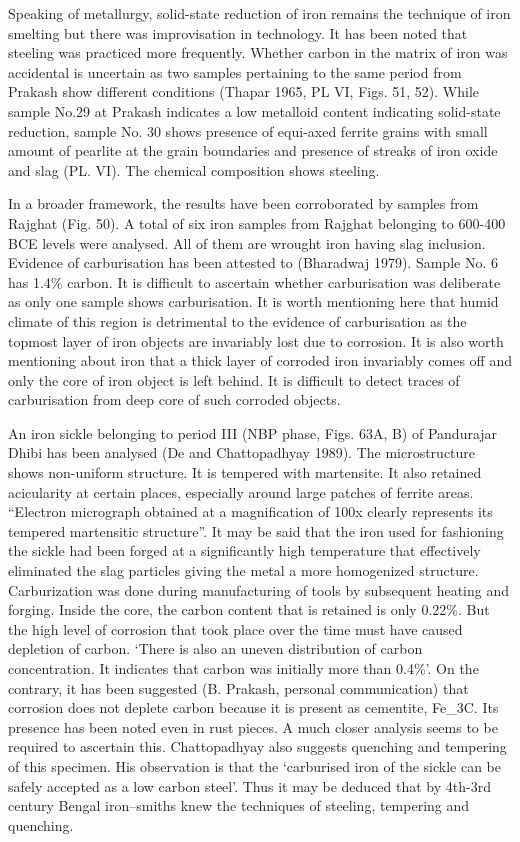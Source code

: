 Speaking of metallurgy, solid-state reduction of iron remains the technique of iron smelting but there was improvisation in technology. It has been noted that steeling was practiced more frequently. Whether carbon in the matrix of iron was accidental is uncertain as two samples pertaining to the same period from Prakash show different conditions (Thapar 1965, PL VI, Figs. 51, 52). While sample No.29 at Prakash indicates a low metalloid content indicating solid-state reduction, sample No. 30 shows presence of equi-axed ferrite grains with small amount of pearlite at the grain boundaries and presence of streaks of iron oxide and slag (PL. VI). The chemical composition shows steeling.

In a broader framework, the results have been corroborated by samples from Rajghat (Fig. 50). A total of six iron samples from Rajghat belonging to 600-400 BCE levels were analysed. All of them are wrought iron having slag inclusion. Evidence of carburisation has been attested to (Bharadwaj 1979). Sample No. 6 has 1.4\% carbon. It is difficult to ascertain whether carburisation was deliberate as only one sample shows carburisation. It is worth mentioning here that humid climate of this region is detrimental to the evidence of carburisation as the topmost layer of iron objects are invariably lost due to corrosion. It is also worth mentioning about iron that a thick layer of corroded iron invariably comes off and only the core of iron object is left behind. It is difficult to detect traces of carburisation from deep core of such corroded objects.

An iron sickle belonging to period III (NBP phase, Figs. 63A, B) of Pandurajar Dhibi has been analysed (De and Chattopadhyay 1989). The microstructure shows non-uniform structure. It is tempered with martensite. It also retained acicularity at certain places, especially around large patches of ferrite areas. “Electron micrograph obtained at a magnification of 100x clearly represents its tempered martensitic structure”. It may be said that the iron used for fashioning the sickle had been forged at a significantly high temperature that effectively eliminated the slag particles giving the metal a more homogenized structure. Carburization was done during manufacturing of tools by subsequent heating and forging. Inside the core, the carbon content that is retained is only 0.22\%. But the high level of corrosion that took place over the time must have caused depletion of carbon. ‘There is also an uneven distribution of carbon concentration. It indicates that carbon was initially more than 0.4\%’. On the contrary, it has been suggested (B. Prakash, personal communication) that corrosion does not deplete carbon because it is present as cementite, Fe_3C. Its presence has been noted even in rust pieces. A much closer analysis seems to be required to ascertain this. Chattopadhyay also suggests quenching and tempering of this specimen. His observation is that the ‘carburised iron of the sickle can be safely accepted as a low carbon steel’. Thus it may be deduced that by 4th-3rd century Bengal iron–smiths knew the techniques of steeling, tempering and quenching.

